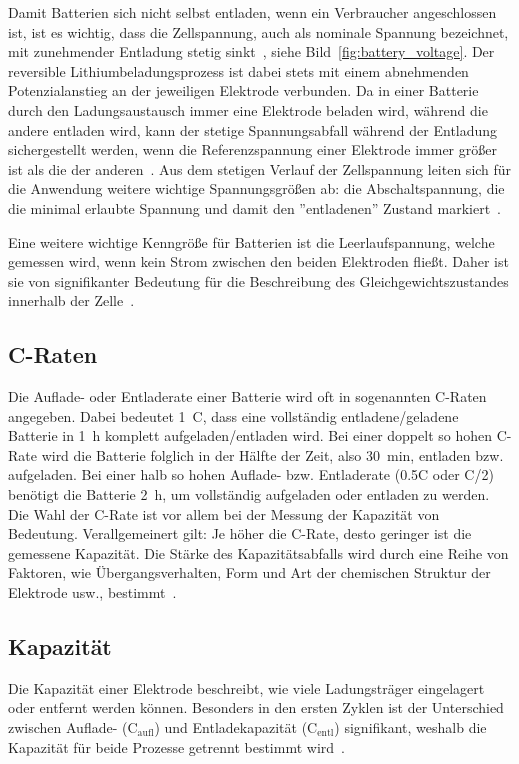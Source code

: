 Damit Batterien sich nicht selbst entladen, wenn ein Verbraucher angeschlossen ist, ist es wichtig, dass die Zellspannung, auch als nominale Spannung bezeichnet, mit zunehmender Entladung stetig sinkt~\cite{Newman2021}, siehe Bild~\ref{fig:battery_voltage}. Der reversible Lithiumbeladungsprozess ist dabei stets mit einem abnehmenden Potenzialanstieg an der jeweiligen Elektrode verbunden. Da in einer Batterie durch den Ladungsaustausch immer eine Elektrode beladen wird, während die andere entladen wird, kann der stetige Spannungsabfall während der Entladung sichergestellt werden, wenn die Referenzspannung einer Elektrode immer größer ist als die der anderen~\cite{Plett2024}. Aus dem stetigen Verlauf der Zellspannung leiten sich für die Anwendung weitere wichtige Spannungsgrößen ab: die Abschaltspannung, die die minimal erlaubte Spannung und damit den ''entladenen'' Zustand markiert~\cite{Plett2015}.

Eine weitere wichtige Kenngröße für Batterien ist die Leerlaufspannung, welche gemessen wird, wenn kein Strom zwischen den beiden Elektroden fließt. Daher ist sie von signifikanter Bedeutung für die Beschreibung des Gleichgewichtszustandes innerhalb der Zelle~\cite{Newman2021}.

\subsection{C-Raten}
Die Auflade- oder Entladerate einer Batterie wird oft in sogenannten C-Raten angegeben. Dabei bedeutet 1~C, dass eine vollständig entladene/geladene Batterie in 1~h komplett aufgeladen/entladen wird. Bei einer doppelt so hohen C-Rate wird die Batterie folglich in der Hälfte der Zeit, also 30~min, entladen bzw. aufgeladen. Bei einer halb so hohen Auflade- bzw. Entladerate (0.5C oder C/2) benötigt die Batterie 2~h, um vollständig aufgeladen oder entladen zu werden. Die Wahl der C-Rate ist vor allem bei der Messung der Kapazität von Bedeutung. Verallgemeinert gilt: Je höher die C-Rate, desto geringer ist die gemessene Kapazität. Die Stärke des Kapazitätsabfalls wird durch eine Reihe von Faktoren, wie Übergangsverhalten, Form und Art der chemischen Struktur der Elektrode usw., bestimmt~\cite{Plett2015,Beard2019}.


\subsection{Kapazität}
Die Kapazität einer Elektrode beschreibt, wie viele Ladungsträger eingelagert oder entfernt werden können. Besonders in den ersten Zyklen ist der Unterschied zwischen Auflade- ($\text{C}_{\text{aufl}}$) und Entladekapazität ($\text{C}_{\text{entl}}$) signifikant, weshalb die Kapazität für beide Prozesse getrennt bestimmt wird~\cite{Plett2015}.

